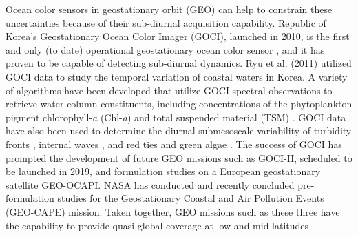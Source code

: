 \documentclass[remotesensing,article,submit,moreauthors,pdftex,10pt,a4paper]{Definitions/mdpi}
\begin{document}




Ocean color sensors in geostationary orbit (GEO) can help to constrain these uncertainties because of their sub-diurnal acquisition capability. Republic of Korea’s Geostationary Ocean Color Imager (GOCI), launched in 2010, is the first and only (to date) operational geostationary ocean color sensor \cite{Ryu2012}, and it has proven to be capable of detecting sub-diurnal dynamics. Ryu et al. (2011) \cite{Ryu2011} utilized GOCI data to study the temporal variation of coastal waters in Korea. A variety of algorithms have been developed that utilize GOCI spectral observations to retrieve water-column constituents, including concentrations of the phytoplankton pigment chlorophyll-{\it a} (Chl-{\it a}) and total suspended material (TSM) \cite{kim_2016_TSM,He2013}. GOCI data have also been used to determine the diurnal submesoscale variability of turbidity fronts \cite{Hu2016}, internal waves \cite{kim_2018}, and red ties and green algae \cite{noh_2018,son_2015}. The success of GOCI has prompted the development of future GEO missions such as GOCI-II, scheduled to be launched in 2019, and formulation studies on a European geostationary satellite GEO-OCAPI. NASA has conducted and recently concluded pre-formulation studies for the Geostationary Coastal and Air Pollution Events (GEO-CAPE) mission. Taken together, GEO missions such as these three have the capability to provide quasi-global coverage at low and mid-latitudes \cite{Ruddick2014}. 




\end{document}
